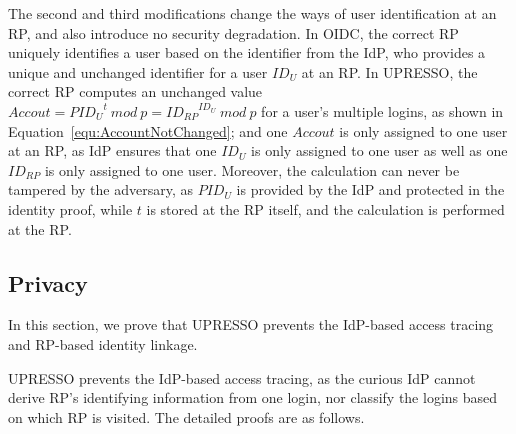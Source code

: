 The second and third modifications change the ways of user identification at an RP, and also introduce no security degradation.
In OIDC, the correct RP uniquely identifies a user based on the identifier from the IdP, who provides a unique and unchanged identifier for a user $ID_U$ at an RP.
In UPRESSO,  the correct RP  computes an unchanged value $Accout = {PID_U}^t\ mod\ p = {ID_{RP}}^{ID_U}\ mod\ p$  for a user's multiple logins, as shown in Equation~\ref{equ:AccountNotChanged};
 and one $Accout$ is only assigned to one user at an RP,  as IdP ensures that one $ID_U$ is only assigned to one user as well as one $ID_{RP}$ is only assigned to one user.
Moreover, the calculation can never be tampered by the adversary,  as  $PID_U$ is provided by the IdP and protected in the identity proof, while $t$ is stored at the RP itself, and the calculation is performed at the RP.


\subsection{Privacy}
\label{subsec:privacy}
In this section, we prove that UPRESSO prevents the IdP-based access tracing and RP-based identity linkage.

UPRESSO prevents the IdP-based access tracing, as the curious IdP cannot derive RP's identifying information from one login, nor classify the logins based on which RP is visited.
The detailed proofs are as follows.

